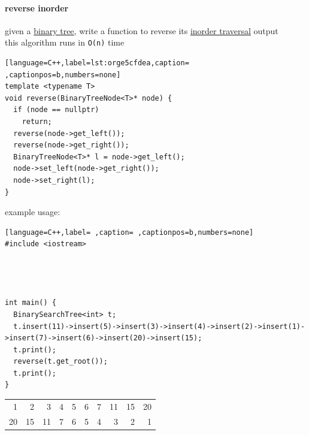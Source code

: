 \documentclass[a4paper,12pt]{article}
\begin{document}
\paragraph{reverse inorder}
\label{sec:org45f4751}
given a \hyperref[sec:org254f5f7]{binary tree}, write a function to reverse its \hyperref[sec:org719f705]{inorder traversal} output\\[0pt]
this algorithm runs in \texttt{O(n)} time\\[0pt]
\begin{lstlisting}[language=C++,label=lst:orge5cfdea,caption= ,captionpos=b,numbers=none]
template <typename T>
void reverse(BinaryTreeNode<T>* node) {
  if (node == nullptr)
    return;
  reverse(node->get_left());
  reverse(node->get_right());
  BinaryTreeNode<T>* l = node->get_left();
  node->set_left(node->get_right());
  node->set_right(l);
}
\end{lstlisting}

example usage:\\[0pt]

\begin{lstlisting}[language=C++,label= ,caption= ,captionpos=b,numbers=none]
#include <iostream>




int main() {
  BinarySearchTree<int> t;
  t.insert(11)->insert(5)->insert(3)->insert(4)->insert(2)->insert(1)->insert(7)->insert(6)->insert(20)->insert(15);
  t.print();
  reverse(t.get_root());
  t.print();
}
\end{lstlisting}

\begin{center}
\begin{tabular}{rrrrrrrrrr}
1 & 2 & 3 & 4 & 5 & 6 & 7 & 11 & 15 & 20\\[0pt]
20 & 15 & 11 & 7 & 6 & 5 & 4 & 3 & 2 & 1\\[0pt]
\end{tabular}
\end{center}
\end{document}
